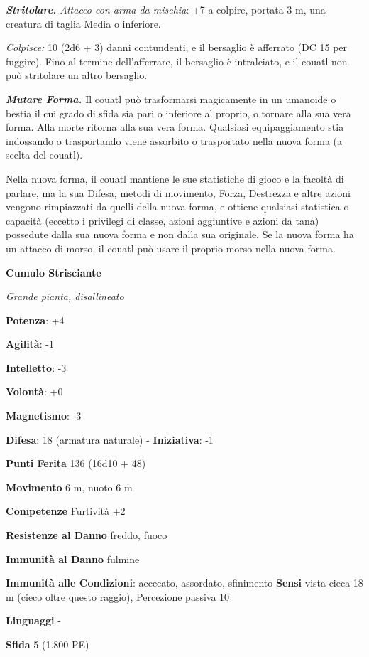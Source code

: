 \begin{multicols}{2}
\emph{\textbf{Stritolare.} Attacco con arma da mischia}: +7 a colpire,
portata 3 m, una creatura di taglia Media o inferiore.

\emph{Colpisce:} 10 (2d6 + 3) danni contundenti, e il bersaglio è
afferrato (DC 15 per fuggire). Fino al termine dell'afferrare, il
bersaglio è intralciato, e il couatl non può stritolare un altro
bersaglio.

\emph{\textbf{Mutare Forma.}} Il couatl può trasformarsi magicamente in
un umanoide o bestia il cui grado di sfida sia pari o inferiore al
proprio, o tornare alla sua vera forma. Alla morte ritorna alla sua vera
forma. Qualsiasi equipaggiamento stia indossando o trasportando viene
assorbito o trasportato nella nuova forma (a scelta del couatl).

Nella nuova forma, il couatl mantiene le sue statistiche di gioco e la
facoltà di parlare, ma la sua Difesa, metodi di movimento, Forza, Destrezza
e altre azioni vengono rimpiazzati da quelli della nuova forma, e
ottiene qualsiasi statistica o capacità (eccetto i privilegi di classe,
azioni aggiuntive e azioni da tana) possedute dalla sua nuova forma e
non dalla sua originale. Se la nuova forma ha un attacco di morso, il
couatl può usare il proprio morso nella nuova forma.

\textbf{Cumulo Strisciante}

\emph{Grande pianta, disallineato}

\textbf{Potenza}: +4

\textbf{Agilità}: -1

\textbf{Intelletto}: -3

\textbf{Volontà}: +0

\textbf{Magnetismo}: -3

\textbf{Difesa}: 18 (armatura naturale) - \textbf{Iniziativa}: -1

\textbf{Punti Ferita} 136 (16d10 + 48)

\textbf{Movimento} 6 m, nuoto 6 m

\textbf{Competenze} Furtività +2

\textbf{Resistenze al Danno} freddo, fuoco

\textbf{Immunità al Danno} fulmine

\textbf{Immunità alle Condizioni}: accecato, assordato, sfinimento
\textbf{Sensi} vista cieca 18 m (cieco oltre questo raggio), Percezione
passiva 10

\textbf{Linguaggi} -

\textbf{Sfida} 5 (1.800 PE)\smallskip


\end{multicols}
